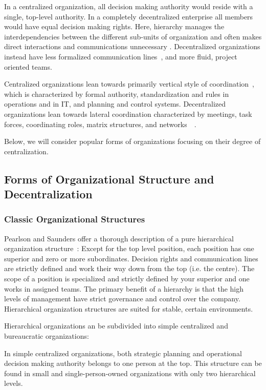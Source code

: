 In a centralized organization, all decision making authority would reside with a single, top-level authority. In a completely decentralized enterprise all members would have equal decision making rights. Here, hierarchy manages the interdependencies between the different sub-units of organization and often makes direct interactions and communications unnecessary \cite{thompson1967}.  Decentralized organizations instead have less formalized communication lines~\cite{pearlson2009}, and more fluid, project oriented teams.~\cite{applegate1988}

Centralized organizations lean towards primarily vertical style of coordination~\cite{Bolman2008}, which is characterized by formal authority, standardization and rules in operations and in IT, and planning and control systems. Decentralized organizations lean towards lateral coordination characterized by meetings, task forces, coordinating roles, matrix structures, and networks~~\cite{Bolman2008}. 

Below, we will consider popular forms of organizations focusing on their degree of centralization. 

\subsection{Forms of Organizational Structure and Decentralization}

\subsubsection{Classic Organizational Structures}

Pearlson and Saunders offer a thorough description of a pure hierarchical organization structure~\cite{pearlson2009}: Except for the top level position, each position has one superior and zero or more subordinates. Decision rights and communication lines are strictly defined and work their way down from the top (i.e. the centre). The scope of a position is specialized and strictly defined by your superior and one works in assigned teams. The primary benefit of a hierarchy is that the high levels of management have strict governance and control over the company. Hierarchical organization structures are suited for stable, certain environments. 

Hierarchical organizations an be subdivided into simple centralized and bureaucratic organizations:

In simple centralized organizations, both strategic planning and operational decision making authority belongs to one person at the top. This structure can be found in small and single-person-owned organizations with only two hierarchical levels. 

